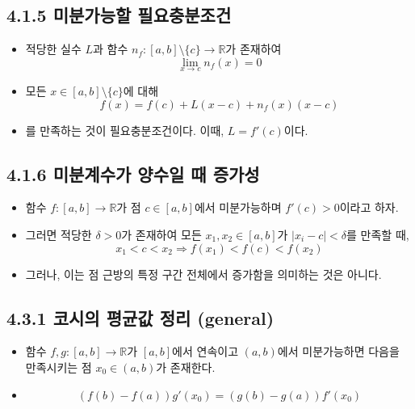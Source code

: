 \documentclass{article}
\begin{document}
\subsection*{\textmd{4.1.5 미분가능할 필요충분조건}} 
\begin{itemize}
    \item 적당한 실수 \( L \)과 함수 \( n_f: [a,b] \setminus \{c\} \to \mathbb{R} \)가 존재하여
    \[ \lim_{x \to c} n_f(x) = 0 \]
    \item 모든 \( x \in [a,b] \setminus \{c\} \)에 대해
    \[ f(x) = f(c) + L(x - c) + n_f(x)(x - c) \]
    \item 를 만족하는 것이 필요충분조건이다. 이때, \( L = f'(c) \)이다.
\end{itemize}

\subsection*{\textmd{4.1.6 미분계수가 양수일 때 증가성}} 
\begin{itemize}
    \item 함수 \( f: [a,b] \to \mathbb{R} \)가 점 \( c \in [a,b] \)에서 미분가능하며 \( f'(c) > 0 \)이라고 하자.
    \item 그러면 적당한 \( \delta > 0 \)가 존재하여 모든 \( x_1, x_2 \in [a,b] \)가 \( |x_i - c| < \delta \)를 만족할 때,
    \[ x_1 < c < x_2 \Rightarrow f(x_1) < f(c) < f(x_2) \]
    \item 그러나, 이는 점 근방의 특정 구간 전체에서 증가함을 의미하는 것은 아니다.
\end{itemize}


\subsection{\fontsize{11.5}{13}\selectfont{구간 위에서 정의된 미분가능한 함수들의 집합은 벡터공간이다. (연속함수 공간은 실수의 부분집합에 대한 것이었으나 미분가능 함수공간은 구간에 대한 것임을 알자)}}

\subsection{\fontsize{11.5}{13}\selectfont{평균값 정리, 그로부터 유도되는 미분가능함수에 대한 성질들}}

\subsection*{\textmd{4.3.1 코시의 평균값 정리 (general)}}
\begin{itemize}
    \item 함수 \( f,g: [a,b]\to \mathbb{R} \)가 \([a,b]\)에서 연속이고 \((a,b)\)에서 미분가능하면 다음을 만족시키는 점 \( x_0 \in (a,b) \)가 존재한다.
    \item \[ (f(b)-f(a))g'(x_0) = (g(b)-g(a))f'(x_0) \]
\end{itemize}
\end{document}

